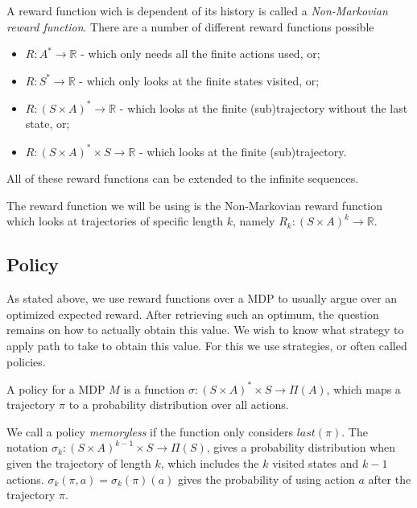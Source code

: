 
A reward function wich is dependent of its history is called a \textit{Non-Markovian reward function}. There are a number of different reward functions possible
\begin{itemize}
	\item $R:A^*\to\mathbb{R}$ - which only needs all the finite actions used, or;
	\item $R:S^*\to\mathbb{R}$ - which only looks at the finite states visited, or;
	\item $R:(S\times A)^*\to\mathbb{R}$ - which looks at the finite (sub)trajectory without the last state, or;
	\item $R:(S\times A)^*\times S\to \mathbb{R}$ - which looks at the finite (sub)trajectory.
\end{itemize}
All of these reward functions can be extended to the infinite sequences. 

The reward function we will be using is the Non-Markovian reward function which looks at trajectories of specific length $k$, namely $R_k:(S\times A)^k\to\mathbb{R}$. 



\subsection*{Policy}
As stated above, we use reward functions over a MDP to usually argue over an optimized expected reward. After retrieving such an optimum, the question remains on how to actually obtain this value. We wish to know what strategy to apply path to take to obtain this value. For this we use strategies, or often called policies. 

\begin{definition}
	A policy for a MDP $M$ is a function $\sigma:(S\times A)^*\times S \to \Pi(A)$, which maps a trajectory $\pi$ to a probability distribution over all actions. 
\end{definition}

We call a policy \textit{memoryless} if the function only considers $last(\pi)$. The notation $\sigma_k:(S\times A)^{k-1}\times S\to \Pi(S)$, gives a probability distribution when given the trajectory of length $k$, which includes the $k$ visited states and $k-1$ actions. $\sigma_k(\pi,a)=\sigma_k(\pi)(a)$ gives the probability of using action $a$ after the trajectory $\pi$.

